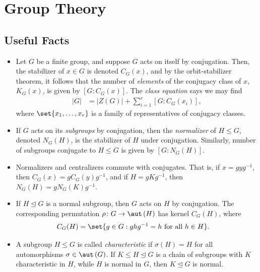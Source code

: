 \documentclass[10pt]{mypackage}
\begin{document}
\RaggedRight
\tableofcontents
\section{Group Theory}%
\subsection{Useful Facts}%
\begin{itemize}
  \item Let $G$ be a finite group, and suppose $G$ acts on itself by conjugation. Then, the stabilizer of $x\in G$ is denoted $C_G(x)$, and by the orbit-stabilizer theorem, it follows that the number of \textit{elements} of the conjugacy class of $x$, $K_G(x)$, is given by $\left[ G:C_G(x) \right]$. The \textit{class equation} says we may find
    \begin{align*}
      \left\vert G \right\vert &= \left\vert Z(G) \right\vert + \sum_{i=1}^{r} \left[ G:C_G\left( x_i \right) \right],
    \end{align*}
    where $\set{x_1,\dots,x_r}$ is a family of representatives of conjugacy classes.
  \item If $G$ acts on its \textit{subgroups} by conjugation, then the \textit{normalizer} of $H\leq G$, denoted $N_G(H)$, is the stabilizer of $H$ under conjugation. Similarly, number of subgroups conjugate to $H\leq G$ is given by $\left[ G:N_G(H) \right]$.
  \item Normalizers and centralizers commute with conjugates. That is, if $x = gyg^{-1}$, then $C_G(x) = g C_G(y) g^{-1}$, and if $H = gKg^{-1}$, then $N_G(H) = g N_G(K) g^{-1}$.
  \item If $H\trianglelefteq G$ is a normal subgroup, then $G$ acts on $H$ by conjugation. The corresponding permutation $\rho\colon G\rightarrow \aut\left( H \right)$ has kernel $C_G(H)$, where
    \begin{align*}
      C_G(H) &= \set{g\in G : ghg^{-1} = h\text{ for all }h\in H}.
    \end{align*}
  \item A subgroup $H\leq G$ is called \textit{characteristic} if $\sigma(H) = H$ for all automorphisms $\sigma\in \aut\left( G \right)$. If $K\leq H\trianglelefteq G$ is a chain of subgroups with $K$ characteristic in $H$, while $H$ is normal in $G$, then $K\trianglelefteq G$ is normal.


\end{itemize}
\end{document}
